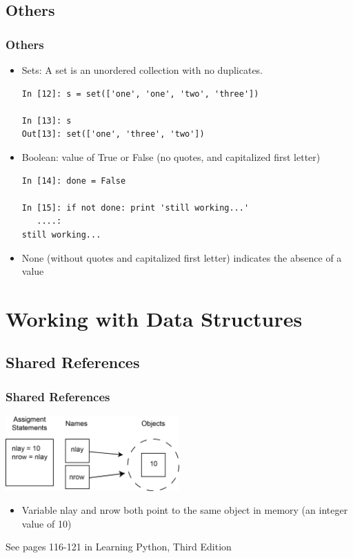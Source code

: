 \documentclass{beamer}
\begin{document}
\subsection{Others}
\begin{frame}[fragile]
\frametitle{Others}
\begin{itemize}
\item Sets: A set is an unordered collection with no duplicates.
\begin{lstlisting}
In [12]: s = set(['one', 'one', 'two', 'three'])

In [13]: s
Out[13]: set(['one', 'three', 'two'])
\end{lstlisting}

\item Boolean: value of True or False (no quotes, and capitalized first letter)\\
\begin{lstlisting}
In [14]: done = False

In [15]: if not done: print 'still working...'
   ....:
still working...

\end{lstlisting}
\item None (without quotes and capitalized first letter) indicates the absence of a value
\end{itemize}
\end{frame}

\section{Working with Data Structures}
\subsection{Shared References}
\begin{frame}[fragile]
\frametitle{Shared References}
  \centering
    \includegraphics[width=0.5\textwidth]{figures/sharedref1.png} 
  \begin{itemize}
    \item{Variable nlay and nrow both point to the same object in memory (an integer value of 10)}
  \end{itemize}
  \tiny{See pages 116-121 in Learning Python, Third Edition}
\end{frame}
\end{document}
